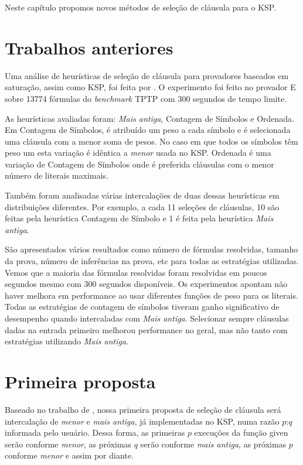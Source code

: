 Neste capítulo propomos novos métodos de seleção de cláusula para o KSP.

\section{Trabalhos anteriores}
Uma análise de heurísticas de seleção de cláusula para provadores baseados em saturação, assim como KSP, foi feita por \cite{stephan}. O experimento foi feito no provador E sobre 13774 fórmulas do \textit{benchmark} TPTP \cite{TPTP} com 300 segundos de tempo limite.

As heurísticas avaliadas foram: \textit{Mais antiga}, Contagem de Símbolos e Ordenada. Em Contagem de Símbolos, é atribuído um peso a cada símbolo e é selecionada uma cláusula com a menor soma de pesos. No caso em que todos os símbolos têm peso um esta variação é idêntica a \textit{menor} usada no KSP. Ordenada é uma variação de Contagem de Símbolos onde é preferida cláusulas com o menor número de literais maximais.

Também foram analisadas várias intercalações de duas dessas heurísticas em distribuições diferentes. Por exemplo, a cada 11 seleções de cláusulas, 10 são feitas pela heurística Contagem de Símbolo e 1 é feita pela heurística \textit{Mais antiga}.

São apresentados vários resultados como número de fórmulas resolvidas, tamanho da prova, número de inferências na prova, etc para todas as estratégias utilizadas. Vemos que a maioria das fórmulas resolvidas foram resolvidas em poucos segundos mesmo com 300 segundos disponíveis. Os experimentos apontam não haver melhora em performance ao usar diferentes funções de peso para os literais. Todas as estratégias de contagem de símbolos tiveram ganho significativo de desempenho quando intercaladas com \textit{Mais antiga}. Selecionar sempre cláusulas dadas na entrada primeiro melhorou performance no geral, mas não tanto com estratégias utilizando \textit{Mais antiga}.

\section{Primeira proposta} \label{secao:1proposta}
Baseado no trabalho de \cite{stephan}, nossa primeira proposta de seleção de cláusula será intercalação de \textit{menor} e \textit{mais antiga}, já implementadas no KSP, numa razão $p$:$q$ informada pelo usuário. Dessa forma, as primeiras $p$ execuções da função {\sf given} serão conforme \textit{menor}, as próximas $q$ serão conforme \textit{mais antiga}, as próximas $p$ conforme \textit{menor} e assim por diante.

